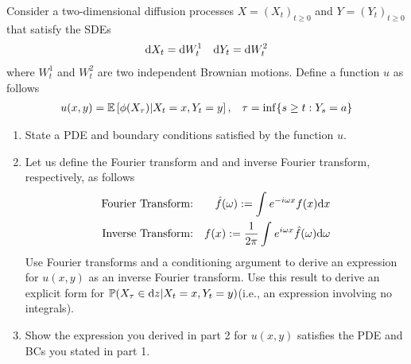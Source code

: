 \begin{problem}[Exercise 9.6]
    Consider a two-dimensional diffusion processes \( X = (X_t)_{t\geq 0} \) and \( Y = (Y_t)_{t\geq 0} \) that satisfy the SDEs
    \begin{align*}
        \mathrm{d} X_t = \mathrm{d} W_t^1 && \mathrm{d} Y_t = \mathrm{d} W_t^2
    \end{align*}
    where \( W_t^1 \) and \( W_t^2 \) are two independent Brownian motions. Define a function \( u \) as follows
    \begin{align*}
        u(x,y) = \mathbb{E} \left[ \phi(X_\tau) | X_t = x, Y_t = y \right], && \tau = \inf\{ s\geq t:Y_s = a \}
    \end{align*}
   
    \begin{enumerate}
        \item State a PDE and boundary conditions satisfied by the function \( u \).
        \item Let us define the Fourier transform and and inverse Fourier transform, respectively, as follows
            \begin{align*}
                \text{Fourier Transform:} && \hat{f}(\omega):= \int_{}^{}e^{-i\omega x}f(x) \mathrm{d} x \\
                \text{Inverse Transform:} && f(x):= \dfrac{1}{2\pi}\int_{}^{}e^{i\omega x}\hat{f}(\omega) \mathrm{d} \omega 
            \end{align*}
        Use Fourier transforms and a conditioning argument to derive an expression for \( u(x,y) \) as an inverse Fourier transform. Use this result to derive an explicit form for \( \mathbb{P}(X_\tau \in \mathrm{d} z |X_t=x,Y_t=y) \)(i.e., an expression involving no integrals).
    \item Show the expression you derived in part 2 for \( u(x,y) \) satisfies the PDE and BCs you stated in part 1.
    \end{enumerate} 
\end{problem}

